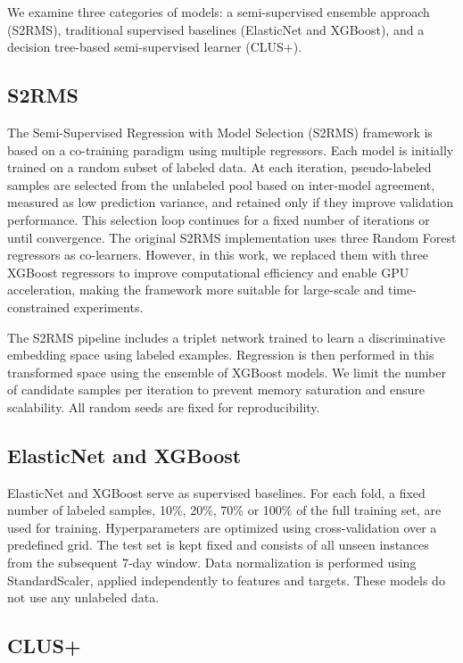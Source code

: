 We examine three categories of models: a semi-supervised ensemble approach (S2RMS), traditional supervised baselines (ElasticNet and XGBoost), and a decision tree-based semi-supervised learner (CLUS+).

\subsection{S2RMS}

The Semi-Supervised Regression with Model Selection (S2RMS)\cite{liu2024semi} framework is based on a co-training paradigm using multiple regressors. Each model is initially trained on a random subset of labeled data. At each iteration, pseudo-labeled samples are selected from the unlabeled pool based on inter-model agreement, measured as low prediction variance, and retained only if they improve validation performance. This selection loop continues for a fixed number of iterations or until convergence. The original S2RMS implementation uses three Random Forest regressors as co-learners. However, in this work, we replaced them with three XGBoost regressors to improve computational efficiency and enable GPU acceleration, making the framework more suitable for large-scale and time-constrained experiments.

The S2RMS pipeline includes a triplet network trained to learn a discriminative embedding space using labeled examples. Regression is then performed in this transformed space using the ensemble of XGBoost models. We limit the number of candidate samples per iteration to prevent memory saturation and ensure scalability. All random seeds are fixed for reproducibility.
\subsection{ElasticNet and XGBoost}

ElasticNet and XGBoost serve as supervised baselines. For each fold, a fixed number of labeled samples, 10\%, 20\%, 70\% or 100\% of the full training set, are used for training. Hyperparameters are optimized using cross-validation over a predefined grid. The test set is kept fixed and consists of all unseen instances from the subsequent 7-day window. Data normalization is performed using StandardScaler, applied independently to features and targets. These models do not use any unlabeled data.

\subsection{CLUS+}

